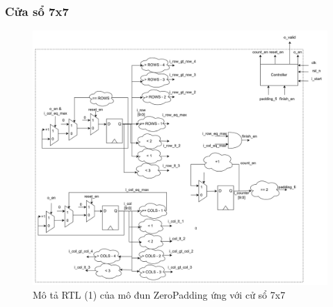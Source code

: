 \subsubsection{Cửa sổ 7x7}
\begin{figure}[!ht]
    \centering
    \includegraphics[width=\linewidth]{figures/zero7x7Architecture1.png}
    \caption{Mô tả RTL (1) của mô đun ZeroPadding ứng với cử sổ 7x7}
    \label{fig:zero7x7Architecture1}
\end{figure}

